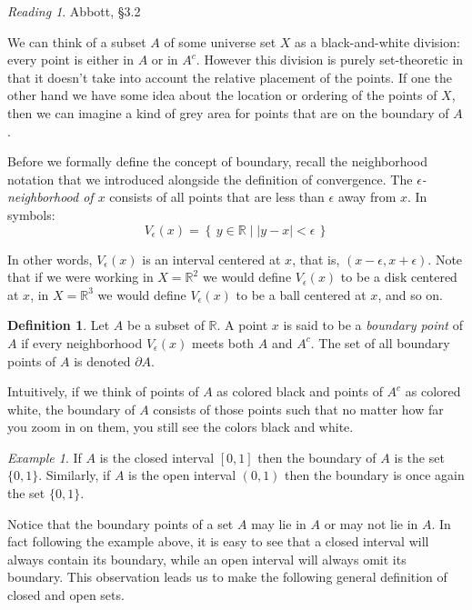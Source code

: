 \documentclass[11pt,oneside]{amsbook}
\newcommand{\set}[1]{\left\{\,#1\,\right\}}
\newcommand{\RR}{\mathbb R}
\theoremstyle{definition}
\theoremstyle{plain}
\theoremstyle{definition}
\newtheorem{defn}[thm]{Definition}
\theoremstyle{remark}
\newtheorem{example}[thm]{Example}
\newtheorem*{reading}{Reading}
\numberwithin{equation}{section}
\numberwithin{figure}{section}
\begin{document}
\begin{reading}
  Abbott, \S 3.2
\end{reading}

We can think of a subset $A$ of some universe set $X$ as a black-and-white division: every point is either in $A$ or in $A^c$. However this division is purely set-theoretic in that it doesn't take into account the relative placement of the points. If one the other hand we have some idea about the location or ordering of the points of $X$, then we can imagine a kind of grey area for points that are on the boundary of $A$.

Before we formally define the concept of boundary, recall the neighborhood notation that we introduced alongside the definition of convergence. The \emph{$\epsilon$-neighborhood of $x$} consists of all points that are less than $\epsilon$ away from $x$. In symbols:
\[V_\epsilon(x)=\set{y\in\RR\mid|y-x|<\epsilon}
\]

In other words, $V_\epsilon(x)$ is an interval centered at $x$, that is, $(x-\epsilon,x+\epsilon)$. Note that if we were working in $X=\RR^2$ we would define $V_\epsilon(x)$ to be a disk centered at $x$, in $X=\RR^3$ we would define $V_\epsilon(x)$ to be a ball centered at $x$, and so on.

\begin{defn}
  Let $A$ be a subset of $\RR$. A point $x$ is said to be a \emph{boundary point} of $A$ if every neighborhood $V_\epsilon(x)$ meets both $A$ and $A^c$. The set of all boundary points of $A$ is denoted $\partial A$.
\end{defn}

Intuitively, if we think of points of $A$ as colored black and points of $A^c$ as colored white, the boundary of $A$ consists of those points such that no matter how far you zoom in on them, you still see the colors black and white.

\begin{example}
  If $A$ is the closed interval $[0,1]$ then the boundary of $A$ is the set $\{0,1\}$. Similarly, if $A$ is the open interval $(0,1)$ then the boundary is once again the set $\{0,1\}$.
\end{example}

Notice that the boundary points of a set $A$ may lie in $A$ or may not lie in $A$. In fact following the example above, it is easy to see that a closed interval will always contain its boundary, while an open interval will always omit its boundary. This observation leads us to make the following general definition of closed and open sets.
\end{document}
